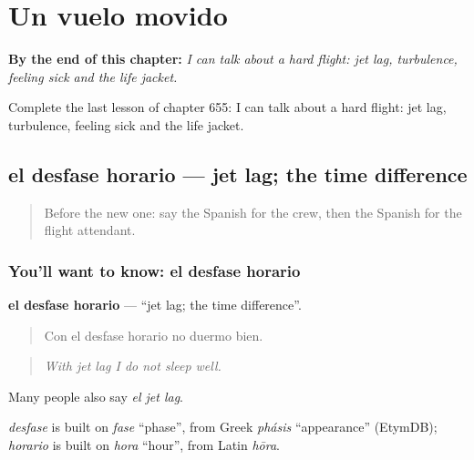 
\chapter{Un vuelo movido}
\label{ch:es-un-vuelo-movido}

\begin{chapteropening}
\textbf{By the end of this chapter:} \emph{I can talk about a hard flight: jet lag, turbulence, feeling sick and the life jacket.}

Complete the last lesson of chapter 655: I can talk about a hard flight: jet lag, turbulence, feeling sick and the life jacket.
\end{chapteropening}

\section[el desfase horario]{el desfase horario — jet lag; the time difference}

\label{lesson:ES-C655-desfase-horario}



\begin{quote}
Before the new one: say the Spanish for the crew, then the Spanish for the flight attendant.
\end{quote}

\subsection*{You'll want to know: el desfase horario}
\textbf{el desfase horario} — \textquotedblleft{}jet lag; the time difference\textquotedblright{}.

\begin{quote}
Con el desfase horario no duermo bien.
\end{quote}

\begin{quote}
\emph{With jet lag I do not sleep well.}
\end{quote}

Many people also say \emph{el jet lag}.

\begin{cousinweb}
\emph{desfase} is built on \emph{fase} \textquotedblleft{}phase\textquotedblright{}, from Greek \emph{phásis} \textquotedblleft{}appearance\textquotedblright{} (EtymDB); \emph{horario} is built on \emph{hora} \textquotedblleft{}hour\textquotedblright{}, from Latin \emph{hōra}.
\end{cousinweb}

